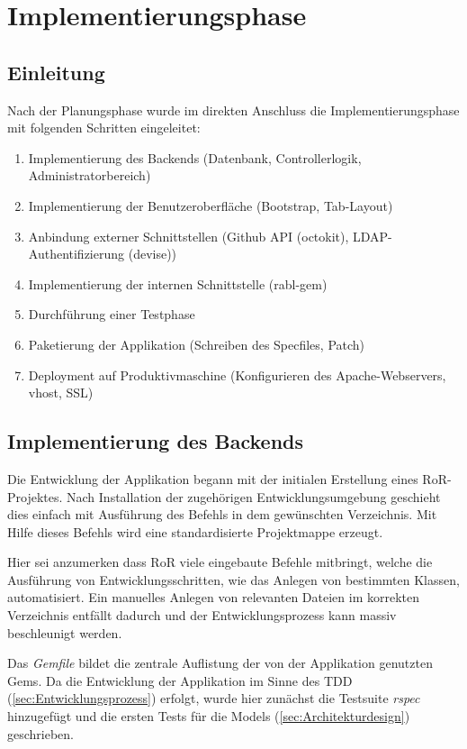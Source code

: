 \section{Implementierungsphase}
\label{sec:Implementierungsphase}

\subsection{Einleitung}
\label{sec:Einleitung}
Nach der Planungsphase wurde im direkten Anschluss die Implementierungsphase mit folgenden Schritten
eingeleitet:
\begin{enumerate}
	\item Implementierung des Backends (Datenbank, Controllerlogik, Administratorbereich)
	\item Implementierung der Benutzeroberfläche (Bootstrap, Tab-Layout)
	\item Anbindung externer Schnittstellen (Github API (octokit), LDAP-Authentifizierung (devise))
	\item Implementierung der internen Schnittstelle (rabl-gem)
	\item Durchführung einer Testphase
	\item Paketierung der Applikation (Schreiben des Specfiles, Patch)
	\item Deployment auf Produktivmaschine (Konfigurieren des Apache-Webservers, vhost, SSL)
\end{enumerate}

\subsection{Implementierung des Backends}
\label{sec:Implementierung des Backends}
Die Entwicklung der Applikation begann mit der initialen Erstellung eines \acs{RoR}-Projektes.
Nach Installation der zugehörigen Entwicklungsumgebung geschieht dies einfach mit Ausführung des
Befehls  in dem gewünschten Verzeichnis. Mit Hilfe dieses Befehls wird eine standardisierte
Projektmappe erzeugt.

Hier sei anzumerken dass RoR viele eingebaute Befehle mitbringt, welche die Ausführung von
Entwicklungsschritten, wie \bspw das Anlegen von bestimmten Klassen, automatisiert. Ein manuelles
Anlegen von relevanten Dateien im korrekten Verzeichnis entfällt dadurch und der Entwicklungsprozess
kann massiv beschleunigt werden.

Das \textit{Gemfile} bildet die zentrale Auflistung der von der Applikation genutzten Gems. Da die
Entwicklung der Applikation im Sinne des \acs{TDD} (\Vgl \ref{sec:Entwicklungsprozess}) erfolgt, wurde hier zunächst die Testsuite
\textit{rspec} hinzugefügt und die ersten Tests für die Models (\Vgl \ref{sec:Architekturdesign})
geschrieben.

